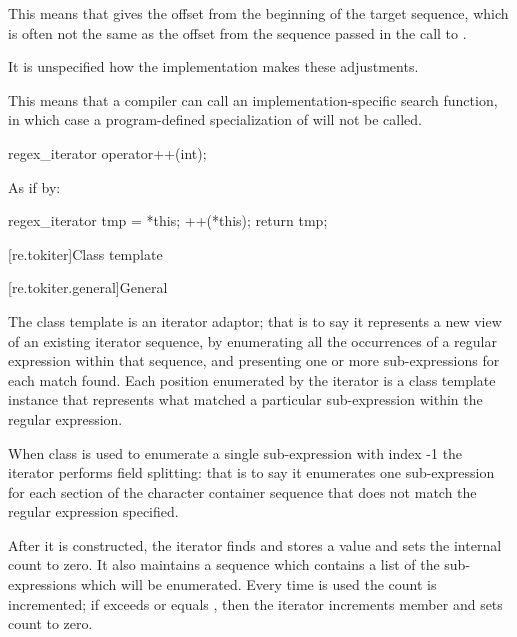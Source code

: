\begin{itemdescr}
\pnum
\begin{note}
This means that  gives the
offset from the beginning of the target sequence, which is often not
the same as the offset from the sequence passed in the call
to .
\end{note}

\pnum
It is unspecified how the implementation makes these adjustments.

\pnum
\begin{note}
This means that a compiler can call an
implementation-specific search function, in which case a program-defined
specialization of  will not be
called.
\end{note}
\end{itemdescr}

%
\begin{itemdecl}
regex_iterator operator++(int);
\end{itemdecl}

\begin{itemdescr}
\pnum
\effects
As if by:
\begin{codeblock}
regex_iterator tmp = *this;
++(*this);
return tmp;
\end{codeblock}
\end{itemdescr}

[re.tokiter]{Class template }

[re.tokiter.general]{General}

\pnum
{}%
The class template  is an iterator adaptor; that
is to say it represents a new view of an existing iterator sequence,
by enumerating all the occurrences of a regular expression within that
sequence, and presenting one or more sub-expressions for each match
found. Each position enumerated by the iterator is a  class
template instance that represents what matched a particular sub-expression
within the regular expression.

\pnum
When class  is used to enumerate a
single sub-expression with index -1 the iterator performs field
splitting: that is to say it enumerates one sub-expression for each section of
the character container sequence that does not match the regular
expression specified.

\pnum
{}%
After it is constructed, the iterator finds and stores a value
and sets the internal count  to zero. It also maintains a sequence
 which contains a list of the sub-expressions which will be
enumerated. Every time  is used
the count  is incremented; if  exceeds or equals ,
then the iterator increments member 
and sets count  to zero.

